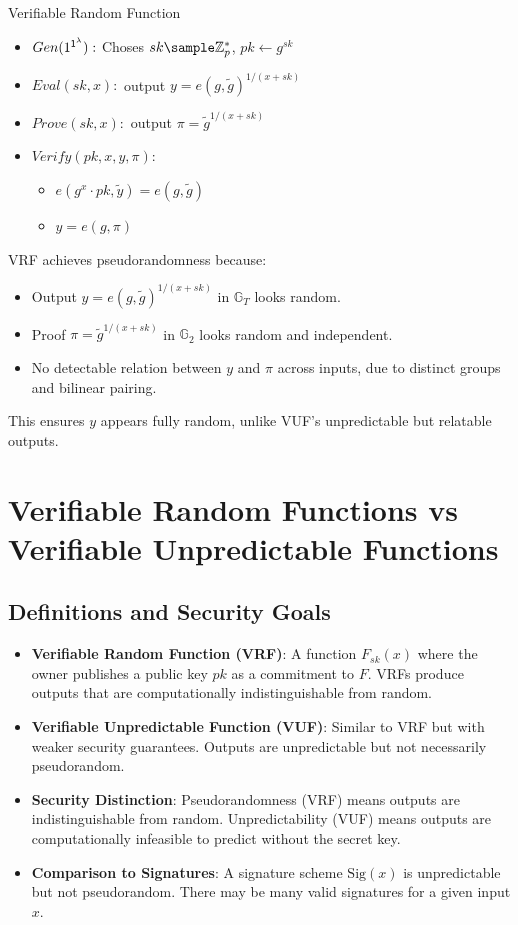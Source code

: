 Verifiable Random Function
\begin{itemize}
    \item $Gen(1^{\mathsf{1^{\lambda}}}):$ Choses $sk \sample \Z_p^*$, $pk \gets g^{sk}$
    \item $Eval(sk, x):$ output $y = e(g, \tilde{g})^{1/(x + sk)}$
    \item $Prove(sk, x):$ output $\pi = \tilde{g}^{1/(x + sk)}$
    \item $Verify(pk, x, y, \pi)$: 
        \begin{itemize}
            \item $e(g^x \cdot pk, \tilde{y}) = e(g, \tilde{g})$ 
            \item $y = e(g, \pi)$
        \end{itemize}
\end{itemize}

VRF achieves pseudorandomness because:
\begin{itemize}
    \item Output $ y = e(g, \tilde{g})^{1/(x + sk)} $ in $ \mathbb{G}_T $ looks random.
    \item Proof $ \pi = \tilde{g}^{1/(x + sk)} $ in $ \mathbb{G}_2 $ looks random and independent.
    \item No detectable relation between $ y $ and $ \pi $ across inputs, due to distinct groups and bilinear pairing.
\end{itemize}
This ensures $ y $ appears fully random, unlike VUF's unpredictable but relatable outputs.



\section{Verifiable Random Functions vs Verifiable Unpredictable Functions}

\subsection{Definitions and Security Goals}

\begin{itemize}
    \item \textbf{Verifiable Random Function (VRF)}: A function $F_{sk}(x)$ where the owner publishes a public key $pk$ as a commitment to $F$. VRFs produce outputs that are computationally indistinguishable from random.
    
    \item \textbf{Verifiable Unpredictable Function (VUF)}: Similar to VRF but with weaker security guarantees. Outputs are unpredictable but not necessarily pseudorandom.
    
    \item \textbf{Security Distinction}: Pseudorandomness (VRF) means outputs are indistinguishable from random. Unpredictability (VUF) means outputs are computationally infeasible to predict without the secret key.
    
    \item \textbf{Comparison to Signatures}: A signature scheme $\text{Sig}(x)$ is unpredictable but not pseudorandom. There may be many valid signatures for a given input $x$.
\end{itemize}

